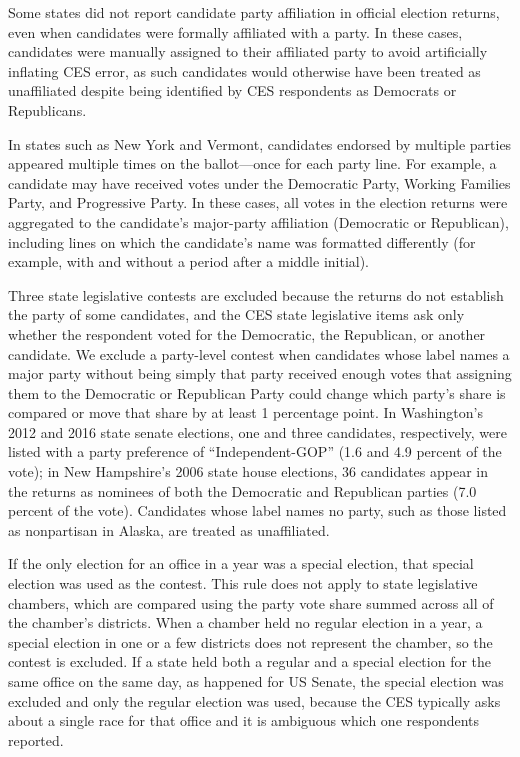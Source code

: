 \documentclass[12pt]{article}
\begin{document}
Some states did not report candidate party affiliation in official election returns, even when candidates were formally affiliated with a party. In these cases, candidates were manually assigned to their affiliated party to avoid artificially inflating CES error, as such candidates would otherwise have been treated as unaffiliated despite being identified by CES respondents as Democrats or Republicans.

In states such as New York and Vermont, candidates endorsed by multiple parties appeared multiple times on the ballot—once for each party line. For example, a candidate may have received votes under the Democratic Party, Working Families Party, and Progressive Party. In these cases, all votes in the election returns were aggregated to the candidate’s major-party affiliation (Democratic or Republican), including lines on which the candidate’s name was formatted differently (for example, with and without a period after a middle initial).

Three state legislative contests are excluded because the returns do not establish the party of some candidates, and the CES state legislative items ask only whether the respondent voted for the Democratic, the Republican, or another candidate. We exclude a party-level contest when candidates whose label names a major party without being simply that party received enough votes that assigning them to the Democratic or Republican Party could change which party’s share is compared or move that share by at least 1 percentage point. In Washington’s 2012 and 2016 state senate elections, one and three candidates, respectively, were listed with a party preference of ``Independent-GOP'' (1.6 and 4.9 percent of the vote); in New Hampshire’s 2006 state house elections, 36 candidates appear in the returns as nominees of both the Democratic and Republican parties (7.0 percent of the vote). Candidates whose label names no party, such as those listed as nonpartisan in Alaska, are treated as unaffiliated.

If the only election for an office in a year was a special election, that special election was used as the contest. This rule does not apply to state legislative chambers, which are compared using the party vote share summed across all of the chamber's districts. When a chamber held no regular election in a year, a special election in one or a few districts does not represent the chamber, so the contest is excluded. If a state held both a regular and a special election for the same office on the same day, as happened for US Senate, the special election was excluded and only the regular election was used, because the CES typically asks about a single race for that office and it is ambiguous which one respondents reported.
\end{document}
